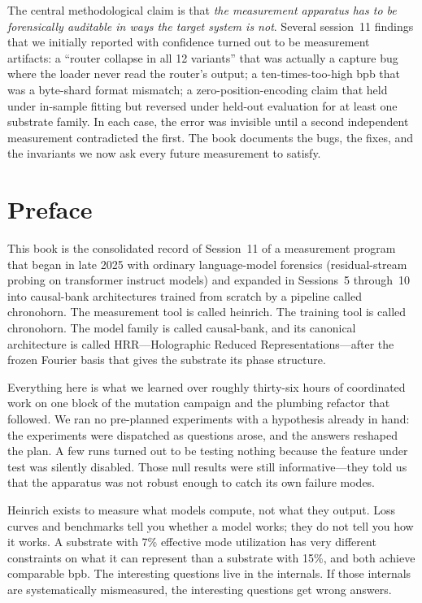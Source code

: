 \documentclass[11pt,openany]{book}
\begin{document}
The central methodological claim is that \emph{the measurement
apparatus has to be forensically auditable in ways the target system
is not}. Several session~11 findings that we initially reported with
confidence turned out to be measurement artifacts: a ``router collapse
in all 12 variants'' that was actually a capture bug where the loader
never read the router's output; a ten-times-too-high bpb that was a
byte-shard format mismatch; a zero-position-encoding claim that held
under in-sample fitting but reversed under held-out evaluation for at
least one substrate family. In each case, the error was invisible until
a second independent measurement contradicted the first. The book
documents the bugs, the fixes, and the invariants we now ask every
future measurement to satisfy.

\tableofcontents

\chapter*{Preface}

This book is the consolidated record of Session~11 of a measurement
program that began in late 2025 with ordinary language-model forensics
(residual-stream probing on transformer instruct models) and expanded
in Sessions~5 through~10 into causal-bank architectures trained from
scratch by a pipeline called chronohorn. The measurement tool is
called heinrich. The training tool is called chronohorn. The model
family is called causal-bank, and its canonical architecture is called
HRR---Holographic Reduced Representations---after the frozen Fourier
basis that gives the substrate its phase structure.

Everything here is what we learned over roughly thirty-six hours of
coordinated work on one block of the mutation campaign and the
plumbing refactor that followed. We ran no pre-planned experiments
with a hypothesis already in hand: the experiments were dispatched as
questions arose, and the answers reshaped the plan. A few runs turned
out to be testing nothing because the feature under test was
silently disabled. Those null results were still informative---they
told us that the apparatus was not robust enough to catch its own
failure modes.

Heinrich exists to measure what models compute, not what they output.
Loss curves and benchmarks tell you whether a model works; they do
not tell you how it works. A substrate with 7\% effective mode
utilization has very different constraints on what it can represent
than a substrate with 15\%, and both achieve comparable bpb. The
interesting questions live in the internals. If those internals are
systematically mismeasured, the interesting questions get wrong
answers.
\end{document}
